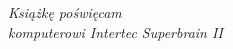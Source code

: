 \begin{titlepage}
\vspace*{\fill}

\begin{flushright}
\emph{Książkę poświęcam \\
komputerowi Intertec Superbrain II}

\end{flushright}

\vspace*{\fill}
\end{titlepage}


